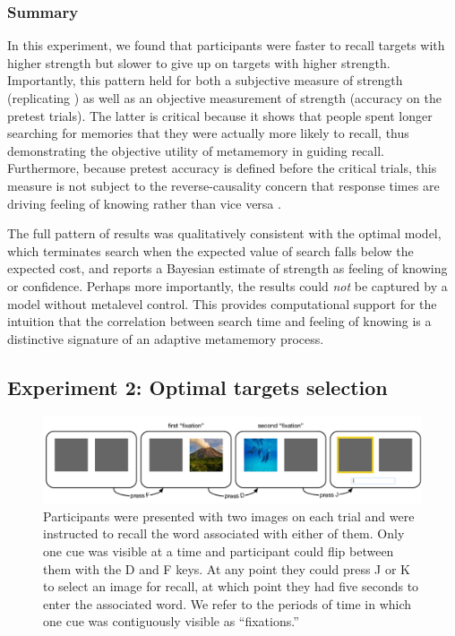 \subsubsection{Summary}

In this experiment, we found that participants were faster to recall targets with higher strength but slower to give up on targets with higher strength. Importantly, this pattern held for both a subjective measure of strength (replicating \citealp{costermans1992confidence}) as well as an objective measurement of strength (accuracy on the pretest trials). The latter is critical because it shows that people spent longer searching for memories that they were actually more likely to recall, thus demonstrating the objective utility of metamemory in guiding recall. Furthermore, because pretest accuracy is defined before the critical trials, this measure is not subject to the reverse-causality concern that response times are driving feeling of knowing rather than vice versa \citep{schwartz2001relation}. 

The full pattern of results was qualitatively consistent with the optimal model, which terminates search when the expected value of search falls below the expected cost, and reports a Bayesian estimate of strength as feeling of knowing or confidence. Perhaps more importantly, the results could \emph{not} be captured by a model without metalevel control. This provides computational support for the intuition that the correlation between search time and feeling of knowing is a distinctive signature of an adaptive metamemory process.

\subsection{Experiment 2: Optimal targets selection}

\begin{figure}[t!]
  \centering
  \includegraphics[width=\textwidth]{figs/memory/task_exp2.pdf}
  \caption{ Participants were presented with two images on each trial and were instructed to recall the word associated with either of them. Only one cue was visible at a time and participant could flip between them with the D and F keys. At any point they could press J or K to select an image for recall, at which point they had five seconds to enter the associated word. We refer to the periods of time in which one cue was contiguously visible as ``fixations.''}
  \label{fig:task-exp2}
\end{figure}

